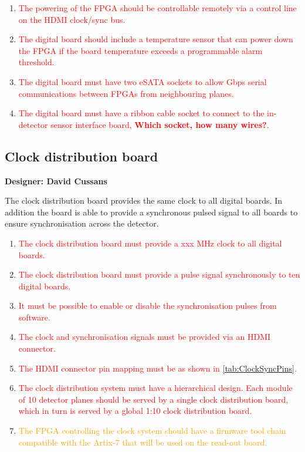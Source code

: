 \documentclass[a4paper]{article}
\newcommand{\must}[1]{\textcolor{red}{#1}}
\newcommand{\should}[1]{\textcolor{orange}{#1}}
\begin{document}
\begin{enumerate}
    \item \must{The powering of the FPGA should be controllable remotely via a control line on the HDMI clock/sync bus.}
    \item \must{The digital board should include a temperature sensor that can power down the FPGA if the board temperature exceeds a programmable alarm threshold.}
    \item \must{The digital board must have two eSATA sockets to allow Gbps serial communications between FPGAs from neighbouring planes.}
    \item \must{The digital board must have a ribbon cable socket to connect to the in-detector sensor interface board, {\bf Which socket, how many wires?}.}
\end{enumerate}

\clearpage
\newpage
\subsection{Clock distribution board}

{\bf Designer: David Cussans}

The clock distribution board provides the same clock to all digital boards.
In addition the board is able to provide a synchronous pulsed signal to all boards to ensure synchronisation across the detector.

\begin{enumerate}
    \item \must{The clock distribution board must provide a xxx MHz clock to all digital boards.}
    \item \must{The clock distribution board must provide a pulse signal synchronously to ten digital boards.}
    \item \must{It must be possible to enable or disable the synchronisation pulses from software.}
    \item \must{The clock and synchronisation signals must be provided via an HDMI connector.}
    \item \must{The HDMI connector pin mapping must be as shown in \cref{tab:ClockSyncPins}.}
    \item \must{The clock distribution system must have a hierarchical design. Each module of 10 detector planes should be served by a single clock distribution board, which in turn is served by a global 1:10 clock distribution board.}
    \item \should{The FPGA controlling the clock system should have a firmware tool chain compatible with the Artix-7 that will be used on the read-out board.}
\end{enumerate}
\end{document}
